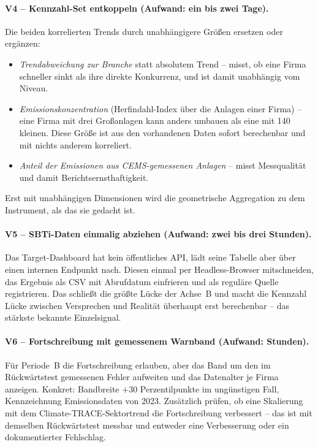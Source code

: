 \documentclass[11pt,a4paper]{article}
\begin{document}
\paragraph{V4 -- Kennzahl-Set entkoppeln (Aufwand: ein bis zwei Tage).}
Die beiden korrelierten Trends durch unabhängigere Größen ersetzen oder ergänzen:
\begin{itemize}
\item \emph{Trendabweichung zur Branche} statt absolutem Trend -- misst, ob eine Firma schneller sinkt als ihre direkte Konkurrenz, und ist damit unabhängig vom Niveau.
\item \emph{Emissionskonzentration} (Herfindahl-Index über die Anlagen einer Firma) -- eine Firma mit drei Großanlagen kann anders umbauen als eine mit 140 kleinen. Diese Größe ist aus den vorhandenen Daten sofort berechenbar und mit nichts anderem korreliert.
\item \emph{Anteil der Emissionen aus CEMS-gemessenen Anlagen} -- misst Messqualität und damit Berichtsernsthaftigkeit.
\end{itemize}
Erst mit unabhängigen Dimensionen wird die geometrische Aggregation zu dem Instrument, als das sie gedacht ist.

\paragraph{V5 -- SBTi-Daten einmalig abziehen (Aufwand: zwei bis drei Stunden).}
Das Target-Dashboard hat kein öffentliches API, lädt seine Tabelle aber über einen internen Endpunkt nach. Diesen einmal per Headless-Browser mitschneiden, das Ergebnis als CSV mit Abrufdatum einfrieren und als reguläre Quelle registrieren. Das schließt die größte Lücke der Achse~B und macht die Kennzahl \glqq Lücke zwischen Versprechen und Realität\grqq{} überhaupt erst berechenbar -- das stärkste bekannte Einzelsignal.

\paragraph{V6 -- Fortschreibung mit gemessenem Warnband (Aufwand: Stunden).}
Für Periode~B die Fortschreibung erlauben, aber das Band um den im Rückwärtstest gemessenen Fehler aufweiten und das Datenalter je Firma anzeigen. Konkret: Bandbreite $+30$ Perzentilpunkte im ungünstigen Fall, Kennzeichnung \glqq Emissionsdaten von 2023\grqq. Zusätzlich prüfen, ob eine Skalierung mit dem Climate-TRACE-Sektortrend die Fortschreibung verbessert -- das ist mit demselben Rückwärtstest messbar und entweder eine Verbesserung oder ein dokumentierter Fehlschlag.
\end{document}
